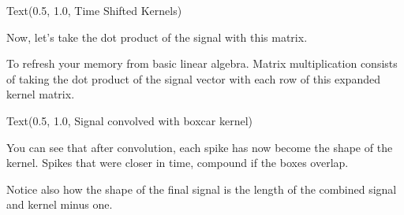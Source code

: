\documentclass[letterpaper,10pt,english]{sphinxmanual}
\begin{document}
\begin{sphinxVerbatim}[commandchars=\\\{\}]
Text(0.5, 1.0, \PYGZsq{}Time Shifted Kernels\PYGZsq{})
\end{sphinxVerbatim}

\noindent{}

Now, let’s take the dot product of the signal with this matrix.

To refresh your memory from basic linear algebra. Matrix multiplication consists of taking the dot product of the signal vector with each row of this expanded kernel matrix.

\begin{sphinxVerbatim}[commandchars=\\\{\}]
   

 
 
 
 
 
\end{sphinxVerbatim}

\begin{sphinxVerbatim}[commandchars=\\\{\}]
Text(0.5, 1.0, \PYGZsq{}Signal convolved with boxcar kernel\PYGZsq{})
\end{sphinxVerbatim}

\noindent{}

You can see that after convolution, each spike has now become the shape of the kernel. Spikes that were closer in time, compound if the boxes overlap.

Notice also how the shape of the final signal is the length of the combined signal and kernel minus one.
\end{document}
